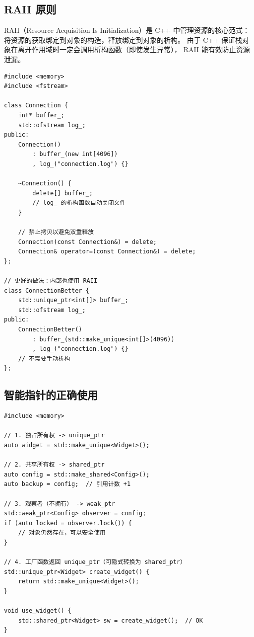 \documentclass[12pt,a4paper,fontset=fandol]{ctexbook}
\begin{document}
\subsection{RAII 原则}

RAII（Resource Acquisition Is Initialization）是 C++ 中管理资源的核心范式：
将资源的获取绑定到对象的构造，释放绑定到对象的析构。
由于 C++ 保证栈对象在离开作用域时一定会调用析构函数（即使发生异常），
RAII 能有效防止资源泄漏。

\begin{lstlisting}[style=cppstyle, caption={RAII 实践}]
#include <memory>
#include <fstream>

class Connection {
    int* buffer_;
    std::ofstream log_;
public:
    Connection()
        : buffer_(new int[4096])
        , log_("connection.log") {}

    ~Connection() {
        delete[] buffer_;
        // log_ 的析构函数自动关闭文件
    }

    // 禁止拷贝以避免双重释放
    Connection(const Connection&) = delete;
    Connection& operator=(const Connection&) = delete;
};

// 更好的做法：内部也使用 RAII
class ConnectionBetter {
    std::unique_ptr<int[]> buffer_;
    std::ofstream log_;
public:
    ConnectionBetter()
        : buffer_(std::make_unique<int[]>(4096))
        , log_("connection.log") {}
    // 不需要手动析构
};
\end{lstlisting}

\subsection{智能指针的正确使用}

\begin{lstlisting}[style=cppstyle, caption={智能指针使用指南}]
#include <memory>

// 1. 独占所有权 -> unique_ptr
auto widget = std::make_unique<Widget>();

// 2. 共享所有权 -> shared_ptr
auto config = std::make_shared<Config>();
auto backup = config;  // 引用计数 +1

// 3. 观察者（不拥有） -> weak_ptr
std::weak_ptr<Config> observer = config;
if (auto locked = observer.lock()) {
    // 对象仍然存在，可以安全使用
}

// 4. 工厂函数返回 unique_ptr（可隐式转换为 shared_ptr）
std::unique_ptr<Widget> create_widget() {
    return std::make_unique<Widget>();
}

void use_widget() {
    std::shared_ptr<Widget> sw = create_widget();  // OK
}
\end{lstlisting}
\end{document}
